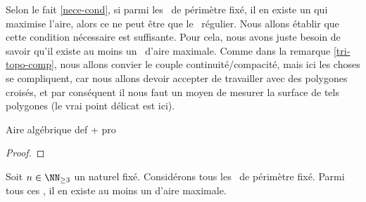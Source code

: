 Selon le fait \ref{nece-cond}, si parmi les \ngones\ de périmètre fixé, il en existe un qui maximise l'aire, alors ce ne peut être que le \ngone\ régulier. Nous allons établir que cette condition nécessaire est suffisante. Pour cela, nous avons juste besoin de savoir qu'il existe au moins un \ngone\ d'aire maximale.
Comme dans la remarque \ref{tri-topo-comp}, nous allons convier le couple continuité/compacité, mais ici les choses se compliquent, car nous allons devoir accepter de travailler avec des polygones croisés, et par conséquent il nous faut un moyen de mesurer la surface de tels polygones (le vrai point délicat est ici).




\begin{fact} \label{suff-cond}
	Aire algébrique def + pro
\end{fact}


\begin{proof}
\end{proof}




\begin{fact} \label{suff-cond}
	Soit $n \in \NN_{\geq3}$ un naturel fixé.
	Considérons tous les \ngones\ de périmètre fixé. Parmi tous ces \ngones, il en existe au moins un d'aire maximale.
\end{fact}


